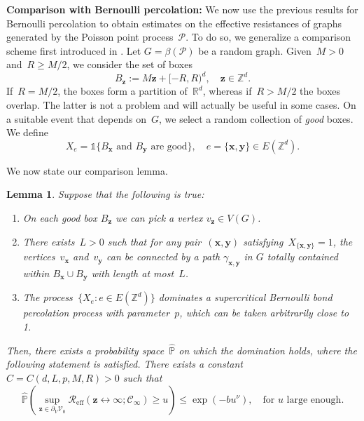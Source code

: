 \documentclass[a4paper,11pt]{article}
\newcommand{\PP}{\mathbb{P}}
\newcommand{\RR}{\mathbb{R}}
\newcommand{\ZZ}{\mathbb{Z}}
\newtheorem{lemma}{Lemma}
\theoremstyle{definition}
\begin{document}
\noindent \textbf{Comparison with Bernoulli percolation:} We now use the previous results for Bernoulli percolation to obtain estimates on the effective resistances of graphs generated by the Poisson point process~$\mathcal P$. To do so, we generalize a comparison scheme first introduced in \cite{recurrenceVoronoiPPP}. Let $G = \beta(\mathcal P)$ be a random graph. Given~$M>0$ and~$R \ge M/2$, we consider the set of boxes
\begin{equation}
    B_{\mathbf z} := M\mathbf{z}+[-R,R) ^d, \quad \mathbf z \in \mathbb Z^d.
\end{equation}
If~$R = M/2$, the boxes form a partition of~$\RR^d$, whereas if~$R>M/2$ the boxes overlap. The latter is not a problem and will actually be useful in some cases. On a suitable event that depends on~$G$, we select a random collection of \textit{good} boxes. We define
$$ X_e = \mathds{1}\{ B_\mathbf{x} \text{ and } B_\mathbf{y} \text{ are good} \}, \quad e = \{\mathbf x, \mathbf y  \} \in E(\ZZ^d). $$

We now state our comparison lemma.

\begin{lemma}\label{lem:comparison_effectiveresistance_percolation_domination}
    Suppose that the following is true:
    \begin{enumerate}
        \item On each good box $B_\mathbf z$ we can pick a vertex $v_{\mathbf z} \in V(G)$.
        \item There exists~$L > 0$ such that for any pair~$(\mathbf x, \mathbf y)$ satisfying~$X_{ \{\mathbf x, \mathbf y\} }=1$, the vertices~$v_{\mathbf x}$ and~$v_{\mathbf y}$ can be connected by a path $\gamma_{\mathbf x,\mathbf y}$ in $G$ totally contained within $B_{\mathbf x}\cup B_{\mathbf y}$ with length at most~$L$.
        \item The process~$\{X_e: e \in E(\ZZ^d)\}$ dominates a supercritical Bernoulli bond percolation process with parameter~$p$, which can be taken arbitrarily close to 1. 
    \end{enumerate}
    Then, there exists a probability space~$\widehat{\PP}$ on which the domination holds, where the following statement is satisfied. There exists a constant~$C = C(d,L,p,M,R)>0$ such that
    $$ \widehat{\PP} \left( \sup_{\mathbf z \in \partial_V\mathcal V_0} \mathcal R_\mathrm{eff}( \mathbf{z} \longleftrightarrow \infty ; \mathcal C_\infty ) \ge u \right) \leq \exp( -b u^\nu ), \quad \text{for } u \text{ large enough}. $$
    
\end{lemma}
\end{document}
